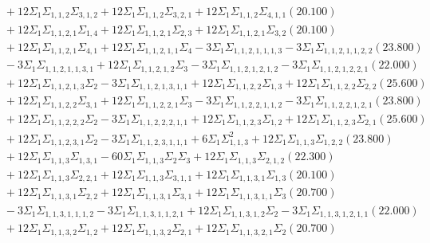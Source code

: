 \documentclass[12pt]{article}
\begin{document}
\begin{landscape}
\begin{align*}
		&\quad\quad +12\Sigma_{1}\Sigma_{1,1,2}\Sigma_{3,1,2}+12\Sigma_{1}\Sigma_{1,1,2}\Sigma_{3,2,1}+12\Sigma_{1}\Sigma_{1,1,2}\Sigma_{4,1,1}(20.100) \\ 
		&\quad\quad +12\Sigma_{1}\Sigma_{1,1,2,1}\Sigma_{1,4}+12\Sigma_{1}\Sigma_{1,1,2,1}\Sigma_{2,3}+12\Sigma_{1}\Sigma_{1,1,2,1}\Sigma_{3,2}(20.100) \\ 
		&\quad\quad +12\Sigma_{1}\Sigma_{1,1,2,1}\Sigma_{4,1}+12\Sigma_{1}\Sigma_{1,1,2,1,1}\Sigma_{4}-3\Sigma_{1}\Sigma_{1,1,2,1,1,1,3}-3\Sigma_{1}\Sigma_{1,1,2,1,1,2,2}(23.800) \\ 
		&\quad\quad -3\Sigma_{1}\Sigma_{1,1,2,1,1,3,1}+12\Sigma_{1}\Sigma_{1,1,2,1,2}\Sigma_{3}-3\Sigma_{1}\Sigma_{1,1,2,1,2,1,2}-3\Sigma_{1}\Sigma_{1,1,2,1,2,2,1}(22.000) \\ 
		&\quad\quad +12\Sigma_{1}\Sigma_{1,1,2,1,3}\Sigma_{2}-3\Sigma_{1}\Sigma_{1,1,2,1,3,1,1}+12\Sigma_{1}\Sigma_{1,1,2,2}\Sigma_{1,3}+12\Sigma_{1}\Sigma_{1,1,2,2}\Sigma_{2,2}(25.600) \\ 
		&\quad\quad +12\Sigma_{1}\Sigma_{1,1,2,2}\Sigma_{3,1}+12\Sigma_{1}\Sigma_{1,1,2,2,1}\Sigma_{3}-3\Sigma_{1}\Sigma_{1,1,2,2,1,1,2}-3\Sigma_{1}\Sigma_{1,1,2,2,1,2,1}(23.800) \\ 
		&\quad\quad +12\Sigma_{1}\Sigma_{1,1,2,2,2}\Sigma_{2}-3\Sigma_{1}\Sigma_{1,1,2,2,2,1,1}+12\Sigma_{1}\Sigma_{1,1,2,3}\Sigma_{1,2}+12\Sigma_{1}\Sigma_{1,1,2,3}\Sigma_{2,1}(25.600) \\ 
		&\quad\quad +12\Sigma_{1}\Sigma_{1,1,2,3,1}\Sigma_{2}-3\Sigma_{1}\Sigma_{1,1,2,3,1,1,1}+6\Sigma_{1}\Sigma_{1,1,3}^{2}+12\Sigma_{1}\Sigma_{1,1,3}\Sigma_{1,2,2}(23.800) \\ 
		&\quad\quad +12\Sigma_{1}\Sigma_{1,1,3}\Sigma_{1,3,1}-60\Sigma_{1}\Sigma_{1,1,3}\Sigma_{2}\Sigma_{3}+12\Sigma_{1}\Sigma_{1,1,3}\Sigma_{2,1,2}(22.300) \\ 
		&\quad\quad +12\Sigma_{1}\Sigma_{1,1,3}\Sigma_{2,2,1}+12\Sigma_{1}\Sigma_{1,1,3}\Sigma_{3,1,1}+12\Sigma_{1}\Sigma_{1,1,3,1}\Sigma_{1,3}(20.100) \\ 
		&\quad\quad +12\Sigma_{1}\Sigma_{1,1,3,1}\Sigma_{2,2}+12\Sigma_{1}\Sigma_{1,1,3,1}\Sigma_{3,1}+12\Sigma_{1}\Sigma_{1,1,3,1,1}\Sigma_{3}(20.700) \\ 
		&\quad\quad -3\Sigma_{1}\Sigma_{1,1,3,1,1,1,2}-3\Sigma_{1}\Sigma_{1,1,3,1,1,2,1}+12\Sigma_{1}\Sigma_{1,1,3,1,2}\Sigma_{2}-3\Sigma_{1}\Sigma_{1,1,3,1,2,1,1}(22.000) \\ 
		&\quad\quad +12\Sigma_{1}\Sigma_{1,1,3,2}\Sigma_{1,2}+12\Sigma_{1}\Sigma_{1,1,3,2}\Sigma_{2,1}+12\Sigma_{1}\Sigma_{1,1,3,2,1}\Sigma_{2}(20.700) \\ 

\end{align*}
\end{landscape}
\end{document}

